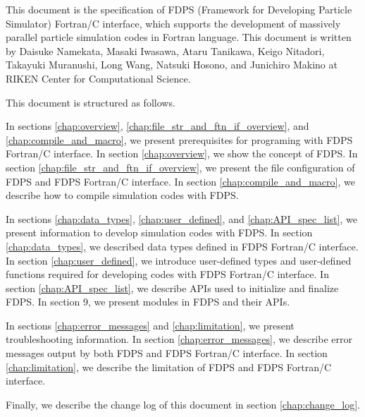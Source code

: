 This document is the specification of FDPS (Framework for Developing Particle Simulator) Fortran/C interface, which supports the development of massively parallel particle simulation codes in Fortran language. This document is written by Daisuke Namekata, Masaki Iwasawa, Ataru Tanikawa, Keigo Nitadori, Takayuki Muranushi, Long Wang, Natsuki Hosono, and Junichiro Makino at RIKEN Center for Computational Science.

This document is structured as follows.

In sections \ref{chap:overview}, \ref{chap:file_str_and_ftn_if_overview}, and \ref{chap:compile_and_macro}, we present prerequisites for programing with FDPS Fortran/C interface. In section \ref{chap:overview}, we show the concept of FDPS. In section \ref{chap:file_str_and_ftn_if_overview}, we present the file configuration of FDPS and FDPS Fortran/C interface. In section \ref{chap:compile_and_macro}, we describe how to compile simulation codes with FDPS.

In sections \ref{chap:data_types}, \ref{chap:user_defined}, and \ref{chap:API_spec_list}, we present information to develop simulation codes with FDPS. In section \ref{chap:data_types}, we described data types defined in FDPS Fortran/C interface. In section \ref{chap:user_defined}, we introduce user-defined types and user-defined functions required for developing codes with FDPS Fortran/C interface. In section \ref{chap:API_spec_list}, we describe APIs used to initialize and finalize FDPS. In section 9, we present modules in FDPS and their APIs.

In sections \ref{chap:error_messages} and \ref{chap:limitation}, we present troubleshooting information. In section \ref{chap:error_messages}, we describe error messages output by both FDPS and FDPS Fortran/C interface. In section \ref{chap:limitation}, we describe the limitation of FDPS and FDPS Fortran/C interface.

Finally, we describe the change log of this document in section \ref{chap:change_log}.